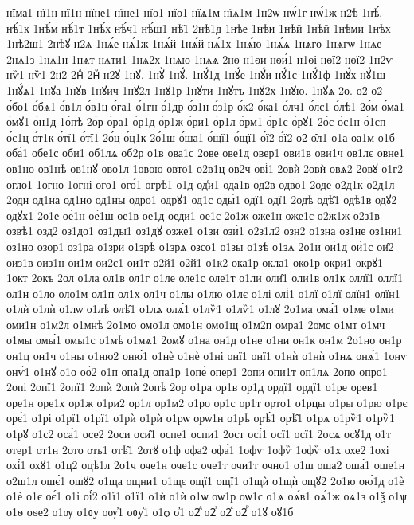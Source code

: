 {нїма1
нї1н
нї1н
нїне1
нїне1
нїо1
нїо1
нїѧ1м
нїѧ1м
1н2ѡ
нѡ́1г
нѡ́1ж
н2ѣ
1нѣ́.
нѣ́1к
1нѣ́м
нѣ́1т
1нѣ́х
нѣ́ч1
нѣ́ш1
нѣ̑1
2нѣ1д
1нѣе
1нѣи
1нѣй
1нѣй
1нѣми
1нѣх
1нѣ2ш1
2нѣꙋ
н2ѧ
1нѧ́е
нѧ́1ж
1нѧ́й
1нѧ́й
нѧ́1х
1нѧ́ю
1нѧ́ѧ
1нѧго
1нѧгѡ
1нѧе
2нѧ1з
1нѧ1н
1нѧт
нѧти1
1нѧ2х
1нѧю
1нѧѧ
2нѳ
н1ѳи
нѳи́1
н1ѳі
нѳї2
нѳї2
1н2ѵ
нѷ1
нѷ1
2н҃2
2нⷣ
2нⷴ
н2ꙋ
1нꙋ.
1нꙋ̀
1нꙋ́.
1нꙋ́1д
1нꙋ́е
1нꙋ́и
нꙋ́1с
1нꙋ́1ф
1нꙋ́х
нꙋ́1ш
1нꙋ́ѧ1
1нꙋа
1нꙋв
1нꙋич
1нꙋ2л
1нꙋ1р
1нꙋти
1нꙋтъ
1нꙋ2х
1нꙋю.
1нꙋѧ
2о.
о2̀
о2́
о́бо1
о́бѧ1
о́в1л
о́в1ц
о́га1
о́1гн
о́1др
о́з1н
о́з1р
о́к2
о́ка1
о́лч1
о́лє1
о́лѣ1
2о́м
о́ма1
о́мꙋ1
о́н1д
1о́пѣ
2о́р
о́ра1
о́р1д
о́р1ж
о́ри1
о́р1л
о́рм1
о́р1с
о́рꙋ1
2о́с
о́с1н
о́1сп
о́с1ц
о́т1к
о́тї1
о́тї1
2о́ц
о́ц1к
2о́1ш
о́ша1
о́щї1
о́щї1
о́ї2
о́ї2
о2̑
о̑л1
о1а
оа1м
о1б
оба́1
обе1с
оби1
об1лѧ
об2р
о1в
ова1с
2ове
ове1д
овер1
ови1в
ови1ч
ов1лє
овне1
ов1но
ов1нѣ
ов1нꙋ
ово1л
1овою
овто1
о2в1ц
ов2ч
ові́1
2овѝ
2овѝ
овѧ2
2овꙋ
о1г2
огло1
1огно
1огні
ого1
ого́1
огрѣ1
о1д
од̾и1
ода1в
од2в
одво1
2оде
о2д1к
о2д1л
2одн
од1на
од1но
од1ны
одро1
одрꙋ1
од1с
оды́1
одї1
одї1
2одѣ
одѣ̑1
одѣ1в
одꙋ2
одꙋх1
2о1е
ое́1н
ое́1ш
ое1в
ое1д
оеди1
ое1с
2о1ж
оже1н
оже1с
о2ж1ж
о2з1в
озвѣ1
озд2
оз1до1
оз1ды1
оз1дꙋ
озже1
о1зи
ози́1
о2з1л2
озн2
о1зна
оз1не
оз1ни1
оз1но
озор1
оз1ра
о1зри
о1зрѣ
о1зрѧ
озсо1
о1зы
о1зѣ
о1зѧ
2о1и
ои́1д
ои́1с
ои̑2
оиз1в
оиз1н
ои1м
ои2с1
ои1т
о2й1
о2й1
о1к2
ока1р
окла1
око1р
окри1
окрꙋ1
1окт
2окъ
2ол
о1ла
ол1в
ол1г
о1ле
оле1с
оле1т
о1ли
оли̑1
оли1в
ол1к
оллї1
оллї1
ол1н
о1ло
оло1м
ол1п
ол1х
ол1ч
о1лы
о1лю
о1лє
о1лі
олі́1
о1лї
о1лї
олїн1
олїн1
о1лѝ
о1лѝ
о1лѡ
о1лѣ
олѣ̑1
о1лѧ
олѧ́1
о1лѷ1
о1лѷ1
о1лꙋ
2о1ма
ома́1
о1ме
о1ми
оми1н
о1м2л
о1мнѣ
2о1мо
омо1л
омо1н
омо1щ
о1м2п
омра1
2омс
о1мт
о1мч
о1мы
омы́1
омы1с
о1мѣ
о1мѧ1
2омꙋ
о1на
он1д
о1не
о1ни
он1к
он1м
2о1но
он1р
он1ц
он1ч
о1ны
о1ню2
оню́1
о1нѐ
о1нѐ
о1ні
онї1
онї1
о1нѝ
о1нѝ
о1нѧ
онѧ́1
1онѵ
онѵ́1
о1нꙋ
о1о
оо́2
о1п
опа1д
опа1р
1опе́
опер1
2опи
опи1т
оп1лѧ
2опо
опро1
2опі
2опї1
2опї1
2опѝ
2опѝ
2опѣ
2ор
о1ра
ор1в
ор1д
ордї1
ордї1
о1ре
орев1
оре1н
оре1х
ор1ж
о1ри2
ор1л
ор1м2
о1ро
ор1с
ор1т
орто1
о1рцы
о1ры
о1рю
о1рє
орє́1
о1рі
о1рї1
о1рї1
о1рѝ
о1рѝ
о1рѡ
орѡ1н
о1рѣ
орѣ́1
орѣ̑1
о1рѧ
о1рѷ1
о1рѷ1
о1рꙋ
о1с2
оса́1
осе2
2оси
оси̑1
оспе1
оспи1
2ост
осі́1
осї1
осї1
2осѧ
осꙋ1д
о1т
отер1
от1н
2ото
оть1
отѣ̑1
2отꙋ
о1ф
офа2
офа́1
1офѵ
1офѷ
1офѷ
о1х
охе2
1охі
охі́1
охꙋ1
о1ц2
оцѣ1л
2о1ч
оче1н
оче1с
оче1т
очи1т
очно1
о1ш
оша2
оша́1
оше1н
о2ш1л
ошє́1
ошꙋ2
о1ща
ощни1
о1щє
ощї1
ощї1
о1щѝ
о1щѝ
ощꙋ2
2о1ю
ою́1д
о1ѐ
о1ѐ
о1є
оє́1
о1і
оі́2
о1ї1
о1ї1
о1ѝ
о1ѝ
о1ѡ
оѡ1р
оѡ1с
о1ѧ
оѧ́в1
оѧ́1ж
оѧ1з
о1ѯ
о1ѱ
о1ѳ
оѳе2
о1ѹ
о1ᲂу
оѹ҆1
оᲂу҆1
о1ѻ
о҆1
о2ⷣ
о2ⷥ
о2ⷦ
о2ⷬ
о1ꙋ
оꙋ1б
}
